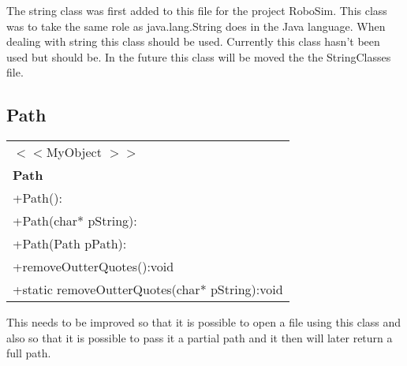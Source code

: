 The string class was first added to this file for the project RoboSim. This class was to take the same role as java.lang.String does in the Java language. When dealing with string this class should be used. Currently this class hasn't been used but should be. In the future this class will be moved the the StringClasses file.

\subsection{Path}
\begin{table}[h]
\begin{tabular}{|l|}\hline
$<<$MyObject $>>$\\
\textbf{Path}\\ \hline
+Path():\\
+Path(char* pString):\\
+Path(Path\ands\xspace pPath):\\
+removeOutterQuotes():void\\
+static removeOutterQuotes(char* pString):void\\ \hline
\end{tabular}
\end{table}

This needs to be improved so that it is possible to open a file using this class and also so that it is possible to pass it a partial path and it then will later return a full path.

